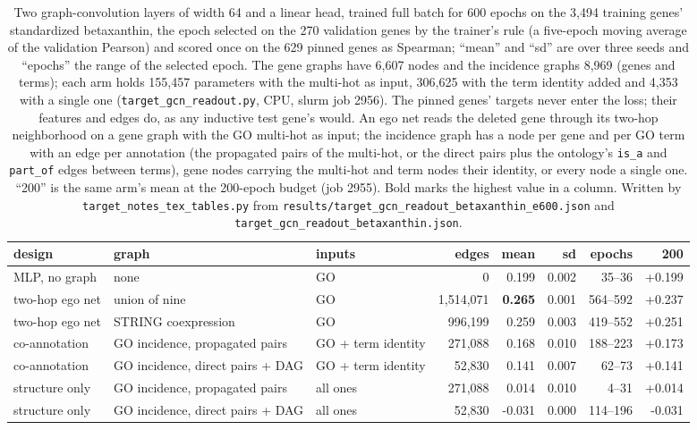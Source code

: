 \begin{table}[H]
  \centering
  \footnotesize
  \caption[Message passing read out at the deleted gene]{Two graph-convolution layers of width 64 and a linear head, trained full batch for 600 epochs on the 3,494 training genes' standardized betaxanthin, the epoch selected on the 270 validation genes by the trainer's rule (a five-epoch moving average of the validation Pearson) and scored once on the 629 pinned genes as Spearman; ``mean'' and ``sd'' are over three seeds and ``epochs'' the range of the selected epoch. The gene graphs have 6,607 nodes and the incidence graphs 8,969 (genes and terms); each arm holds 155,457 parameters with the multi-hot as input, 306,625 with the term identity added and 4,353 with a single one (\texttt{target\_gcn\_readout.py}, CPU, slurm job 2956). The pinned genes' targets never enter the loss; their features and edges do, as any inductive test gene's would. An ego net reads the deleted gene through its two-hop neighborhood on a gene graph with the GO multi-hot as input; the incidence graph has a node per gene and per GO term with an edge per annotation (the propagated pairs of the multi-hot, or the direct pairs plus the ontology's \texttt{is\_a} and \texttt{part\_of} edges between terms), gene nodes carrying the multi-hot and term nodes their identity, or every node a single one. ``200'' is the same arm's mean at the 200-epoch budget (job 2955). Bold marks the highest value in a column. Written by \texttt{target\_notes\_tex\_tables.py} from \texttt{results/target\_gcn\_readout\_betaxanthin\_e600.json} and \texttt{target\_gcn\_readout\_betaxanthin.json}.}
  \label{tab:message-passing}
  \begin{tabular}{@{}lllrrrrr@{}}
    \hline
    design & graph & inputs & edges & mean & sd & epochs & 200 \\
    \hline
    MLP, no graph & none & GO & 0 & 0.199 & 0.002 & 35--36 & +0.199 \\
    two-hop ego net & union of nine & GO & 1,514,071 & \textbf{0.265} & 0.001 & 564--592 & +0.237 \\
    two-hop ego net & STRING coexpression & GO & 996,199 & 0.259 & 0.003 & 419--552 & +0.251 \\
    co-annotation & GO incidence, propagated pairs & GO + term identity & 271,088 & 0.168 & 0.010 & 188--223 & +0.173 \\
    co-annotation & GO incidence, direct pairs + DAG & GO + term identity & 52,830 & 0.141 & 0.007 & 62--73 & +0.141 \\
    structure only & GO incidence, propagated pairs & all ones & 271,088 & 0.014 & 0.010 & 4--31 & +0.014 \\
    structure only & GO incidence, direct pairs + DAG & all ones & 52,830 & -0.031 & 0.000 & 114--196 & -0.031 \\
    \hline
  \end{tabular}
\end{table}
